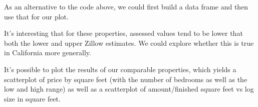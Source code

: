 As an alternative to the code above, we could first build a data frame and then
use that for our plot.
\begin{knitrout}
\end{knitrout}


It's interesting that for these properties, assessed values tend to be lower
that both the lower and upper Zillow estimates.  
We could explore whether this is true in California more generally.

It's possible to plot the results of our comparable properties, which yields a scatterplot
of price by square feet (with the number of bedrooms as well as the low and high range) as
well as a scatterplot of amount/finished square feet vs log size in square feet.
\begin{knitrout}
\end{knitrout}



